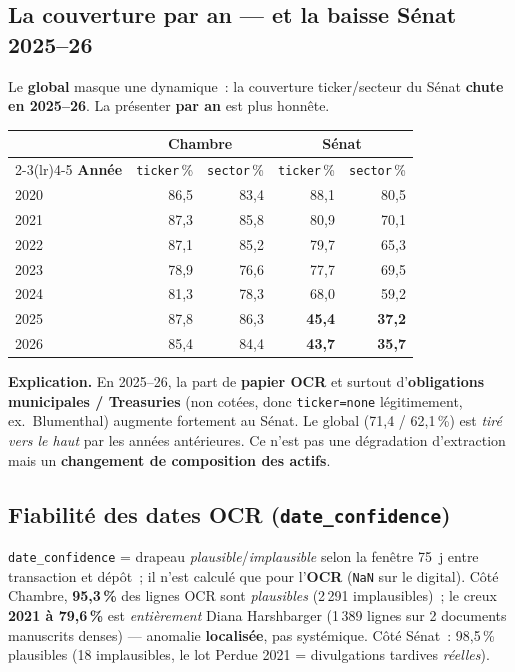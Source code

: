 \documentclass[11pt,a4paper]{article}
\newcommand{\co}[1]{\texttt{\small #1}}
\begin{document}
\subsection{La couverture par an — et la baisse Sénat 2025--26}
Le \textbf{global} masque une dynamique~: la couverture ticker/secteur du Sénat \textbf{chute en
2025--26}. La présenter \textbf{par an} est plus honnête.
\begin{center}\small
\begin{tabular}{l rr rr}
\toprule
 & \multicolumn{2}{c}{\bfseries Chambre} & \multicolumn{2}{c}{\bfseries Sénat}\\
\cmidrule(lr){2-3}\cmidrule(lr){4-5}
\bfseries Année & \co{ticker}\,\% & \co{sector}\,\% & \co{ticker}\,\% & \co{sector}\,\%\\
\midrule
2020 & 86,5 & 83,4 & 88,1 & 80,5 \\
2021 & 87,3 & 85,8 & 80,9 & 70,1 \\
2022 & 87,1 & 85,2 & 79,7 & 65,3 \\
2023 & 78,9 & 76,6 & 77,7 & 69,5 \\
2024 & 81,3 & 78,3 & 68,0 & 59,2 \\
2025 & 87,8 & 86,3 & \textbf{45,4} & \textbf{37,2} \\
2026 & 85,4 & 84,4 & \textbf{43,7} & \textbf{35,7} \\
\bottomrule
\end{tabular}
\end{center}
\textbf{Explication.} En 2025--26, la part de \textbf{papier OCR} et surtout d'\textbf{obligations
municipales / Treasuries} (non cotées, donc \co{ticker=none} légitimement, ex.~Blumenthal) augmente
fortement au Sénat. Le global (71,4 / 62,1\,\%) est \emph{tiré vers le haut} par les années antérieures.
Ce n'est pas une dégradation d'extraction mais un \textbf{changement de composition des actifs}.

\subsection{Fiabilité des dates OCR (\co{date_confidence})}
\co{date_confidence} = drapeau \emph{plausible}/\emph{implausible} selon la fenêtre 75~j entre
transaction et dépôt~; il n'est calculé que pour l'\textbf{OCR} (\co{NaN} sur le digital). Côté
Chambre, \textbf{95,3\,\%} des lignes OCR sont \emph{plausibles} (2\,291 implausibles)~; le creux
\textbf{2021 à 79,6\,\%} est \emph{entièrement} Diana Harshbarger (1\,389 lignes sur 2 documents
manuscrits denses) — anomalie \textbf{localisée}, pas systémique. Côté Sénat~: 98,5\,\% plausibles
(18 implausibles, le lot Perdue 2021 = divulgations tardives \emph{réelles}).
\end{document}
